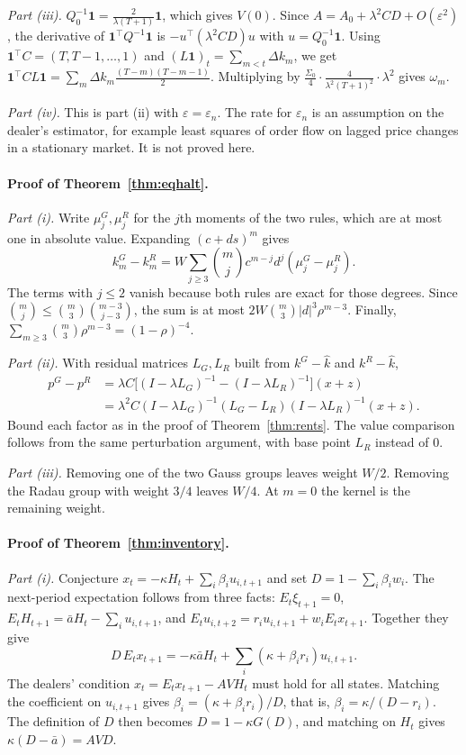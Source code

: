 \documentclass[12pt]{article}
\theoremstyle{definition}
\theoremstyle{remark}
\begin{document}
\emph{Part (iii).} $Q_0^{-1}\mathbf1=\frac{2}{\lambda(T+1)}\mathbf1$, which gives $V(0)$. Since $A=A_0+\lambda^2CD+O(\varepsilon^2)$, the derivative of $\mathbf1^\top Q^{-1}\mathbf1$ is $-u^\top(\lambda^2CD)u$ with $u=Q_0^{-1}\mathbf1$. Using $\mathbf1^\top C=(T,T-1,\ldots,1)$ and $(L\mathbf1)_t=\sum_{m<t}\Delta k_m$, we get $\mathbf1^\top CL\mathbf1=\sum_m\Delta k_m\frac{(T-m)(T-m-1)}2$. Multiplying by $\tfrac{\Sigma_0}4\cdot\frac{4}{\lambda^2(T+1)^2}\cdot\lambda^2$ gives $\omega_m$.

\emph{Part (iv).} This is part (ii) with $\varepsilon=\varepsilon_n$. The rate for $\varepsilon_n$ is an assumption on the dealer's estimator, for example least squares of order flow on lagged price changes in a stationary market. It is not proved here.

\paragraph{Proof of Theorem~\ref{thm:eqhalt}.}
\emph{Part (i).} Write $\mu_j^G,\mu_j^R$ for the $j$th moments of the two rules, which are at most one in absolute value. Expanding $(c+ds)^m$ gives
\[
k_m^G-k_m^R=W\sum_{j\ge3}\binom mj c^{m-j}d^j(\mu_j^G-\mu_j^R).
\]
The terms with $j\le2$ vanish because both rules are exact for those degrees. Since $\binom mj\le\binom m3\binom{m-3}{j-3}$, the sum is at most $2W\binom m3|d|^3\rho^{m-3}$. Finally, $\sum_{m\ge3}\binom m3\rho^{m-3}=(1-\rho)^{-4}$.

\emph{Part (ii).} With residual matrices $L_G,L_R$ built from $k^G-\hat k$ and $k^R-\hat k$,
\begin{align*}
p^G-p^R&=\lambda C\bigl[(I-\lambda L_G)^{-1}-(I-\lambda L_R)^{-1}\bigr](x+z)\\
&=\lambda^2C(I-\lambda L_G)^{-1}(L_G-L_R)(I-\lambda L_R)^{-1}(x+z).
\end{align*}
Bound each factor as in the proof of Theorem~\ref{thm:rents}. The value comparison follows from the same perturbation argument, with base point $L_R$ instead of $0$.

\emph{Part (iii).} Removing one of the two Gauss groups leaves weight $W/2$. Removing the Radau group with weight $3/4$ leaves $W/4$. At $m=0$ the kernel is the remaining weight.


\paragraph{Proof of Theorem~\ref{thm:inventory}.}
\emph{Part (i).} Conjecture $x_t=-\kappa H_t+\sum_i\beta_iu_{i,t+1}$ and set $D=1-\sum_i\beta_iw_i$. The next-period expectation follows from three facts: $E_t\xi_{t+1}=0$, $E_tH_{t+1}=\bar aH_t-\sum_iu_{i,t+1}$, and $E_tu_{i,t+2}=r_iu_{i,t+1}+w_iE_tx_{t+1}$. Together they give
\[
 D\,E_tx_{t+1}=-\kappa\bar aH_t+\sum_i(\kappa+\beta_ir_i)u_{i,t+1}.
\]
The dealers' condition $x_t=E_tx_{t+1}-AVH_t$ must hold for all states. Matching the coefficient on $u_{i,t+1}$ gives $\beta_i=(\kappa+\beta_ir_i)/D$, that is, $\beta_i=\kappa/(D-r_i)$. The definition of $D$ then becomes $D=1-\kappa G(D)$, and matching on $H_t$ gives $\kappa(D-\bar a)=AVD$.
\end{document}
